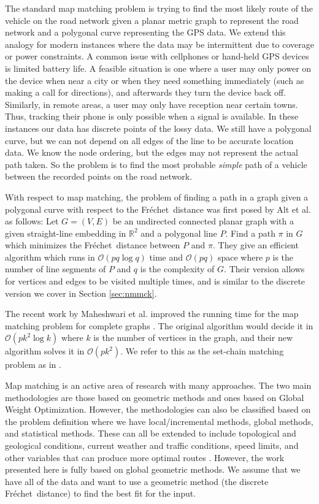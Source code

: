 \documentclass{article}[11pt]
\newcommand{\frechet}{Fr\'echet}
\newcommand{\BO}{\mathcal{O}}
\newcommand{\dfd}{discrete \frechet\ distance}
\begin{document}
The standard map matching problem is trying to find the most likely route of the vehicle on 
the road network given a planar metric graph to represent the road network and a polygonal curve 
representing the GPS data.
We extend this analogy for modern instances where the data may be intermittent due to 
coverage or power constraints.  A common issue with cellphones or hand-held GPS devices is 
limited battery life.  A feasible situation is one where a user may only power on the 
device when near a city or when they need something immediately (such as making a call 
for directions), and afterwards they turn the device back off.  
Similarly, in remote areas, a user may only have reception near certain towns.  
Thus, tracking their phone is only possible when a signal is available.
In these instances our data has discrete points of the lossy data.
We still have a polygonal curve,
but we can not depend on all edges of the line to be accurate location data.
We know the node ordering, but the edges may not represent the actual path taken.
So the problem is to find the most probable \emph{simple} path of a vehicle 
between the recorded points on the road network.


With respect to map matching, the problem of finding a path in a graph given a polygonal 
curve with respect to the \frechet\ distance was first posed by Alt et al. \cite{Alt:2003:JALGS}
as follows: Let $G = (V, E)$ be an undirected connected planar graph with a given straight-line
embedding in $\mathbb{R}^2$ and a polygonal line $P$. Find a path $\pi$ in $G$ which minimizes
the \frechet\ distance between $P$ and $\pi$. They give an efficient algorithm which runs in
$\BO(pq \log q)$ time and $\BO(pq)$ space where $p$ is the number of line segments of $P$ and $q$ is the
complexity of $G$. Their version allows for vertices and edges to be visited multiple times,
and is similar to the discrete version we cover in Section \ref{sec:nmmck}. 


The recent work by Maheshwari et al. improved the running time for the 
map matching problem for complete graphs \cite{Maheshwari:2011:CCCG}.
The original algorithm would decide it in $\BO(pk^2 \log k)$ where $k$ is the number of vertices
in the graph, and their new algorithm solves it in $\BO(pk^2)$.  
We refer to this as the set-chain matching problem as in \cite{Wylie:2014:TCS}. 

Map matching is an active area of research with many approaches.  The two main 
methodologies are those based on geometric methods and ones based on Global Weight Optimization.
However, the methodologies can also be classified based on the problem definition where
we have local/incremental methods, global methods, and statistical methods.
These can all be extended to include topological and geological conditions, 
current weather and traffic conditions, speed limits, and other variables that can 
produce more optimal routes \cite{Lou:2009:GIS,Wei:2013:TECH}. However, the work presented here is fully based on global geometric methods. 
We assume that we have all of the data and want to use a geometric method (the \dfd ) 
to find the best fit for the input.
\end{document}

